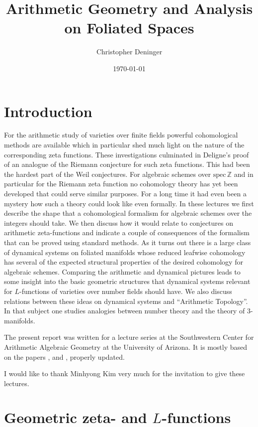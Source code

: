 \documentclass[11pt,leqno]{article}
\newcommand{\Z}{{\mathbb{Z}}}
\newcommand{\spec}{\mathrm{spec}\,}
\begin{document}
\title{Arithmetic Geometry and Analysis on Foliated Spaces}
\author{Christopher Deninger}
\date{\today}
\maketitle



\section{Introduction}

For the arithmetic study of varieties over finite fields powerful cohomological methods are available which in particular shed much light on the nature of the corresponding zeta functions. These investigations culminated in Deligne's proof of an analogue of the Riemann conjecture for such zeta functions. This had been the hardest part of the Weil conjectures. For algebraic schemes over $\spec \Z$ and in particular for the Riemann zeta function no cohomology theory has yet been developed that could serve similar purposes. For a long time it had even been a mystery how such a theory could look like even formally. In these lectures we first describe the shape that a cohomological formalism for algebraic schemes over the integers should take. We then discuss how it would relate to conjectures on arithmetic zeta-functions and indicate a couple of consequences of the formalism that can be proved using standard methods. As it turns out there is a large class of dynamical systems on foliated manifolds whose reduced leafwise cohomology has several of the expected structural properties of the desired cohomology for algebraic schemes. Comparing the arithmetic and dynamical pictures leads to some insight into the basic geometric structures that dynamical systems relevant for $L$-functions of varieties over number fields should have. We also discuss relations between these ideas on dynamical systems and ``Arithmetic Topology''. In that subject one studies analogies between number theory and the theory of $3$-manifolds. 

The present report was written for a lecture series at the Southwestern Center for Arithmetic Algebraic Geometry at the University of Arizona. It is mostly based on the papers \cite{D10}, \cite{D14} and \cite{D15}, properly updated.

I would like to thank Minhyong Kim very much for the invitation to give these lectures.

\section{Geometric zeta- and $L$-functions}
\end{document}
